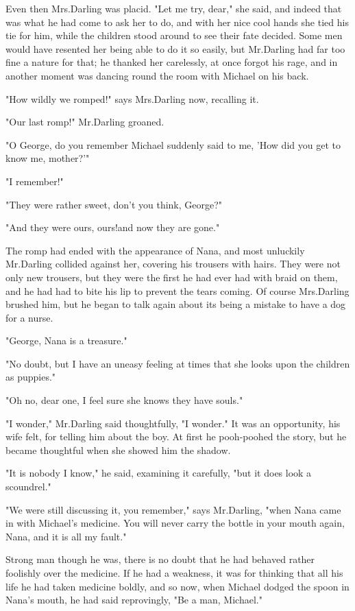 Even then Mrs.\@ Darling was placid.
"Let me try, dear," she said, and indeed that was what he had come to ask her to do, and with her nice cool hands she tied his tie for him, while the children stood around to see their fate decided.
Some men would have resented her being able to do it so easily, but Mr.\@ Darling had far too fine a nature for that;
he thanked her carelessly, at once forgot his rage, and in another moment was dancing round the room with Michael on his back.

"How wildly we romped!\@" says Mrs.\@ Darling now, recalling it.

"Our last romp!\@" Mr.\@ Darling groaned.

"O George, do you remember Michael suddenly said to me, 'How did you get to know me, mother?'"

"I remember!"

"They were rather sweet, don't you think, George?"

"And they were ours, ours!\@ and now they are gone."

The romp had ended with the appearance of Nana, and most unluckily Mr.\@ Darling collided against her, covering his trousers with hairs.
They were not only new trousers, but they were the first he had ever had with braid on them, and he had had to bite his lip to prevent the tears coming.
Of course Mrs.\@ Darling brushed him, but he began to talk again about its being a mistake to have a dog for a nurse.

"George, Nana is a treasure."

"No doubt, but I have an uneasy feeling at times that she looks upon the children as puppies."

"Oh no, dear one, I feel sure she knows they have souls."

"I wonder," Mr.\@ Darling said thoughtfully, "I wonder."
It was an opportunity, his wife felt, for telling him about the boy.
At first he pooh-poohed the story, but he became thoughtful when she showed him the shadow.

"It is nobody I know," he said, examining it carefully, "but it does look a scoundrel."

"We were still discussing it, you remember," says Mr.\@ Darling, "when Nana came in with Michael's medicine.
You will never carry the bottle in your mouth again, Nana, and it is all my fault."

Strong man though he was, there is no doubt that he had behaved rather foolishly over the medicine.
If he had a weakness, it was for thinking that all his life he had taken medicine boldly, and so now, when Michael dodged the spoon in Nana's mouth, he had said reprovingly, "Be a man, Michael."

